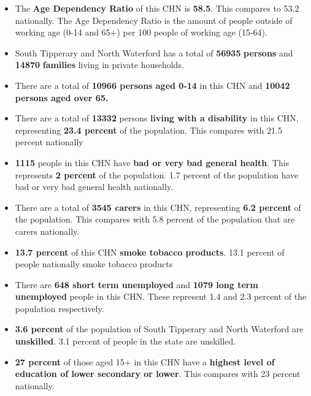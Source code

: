 \documentclass{article}
\begin{document}
\begin{itemize}

\item The \textbf{Age Dependency Ratio} of this CHN is  \textbf{58.5}. This compares to 53.2 nationally. The Age Dependency Ratio is the amount of people outside of working age (0-14 and 65+) per 100 people of working age (15-64). 

\item South Tipperary and North Waterford has a total of \textbf{\num{56935}} \textbf{persons} and  \textbf{\num{14870}} \textbf{families} living in private households.

\item There are a total of \textbf{\num{10966} persons aged 0-14} in this CHN and \textbf{\num{10042} persons aged over 65.} 

\item There are a total of \textbf{\num{13332}} persons \textbf{living with a disability} in this CHN, representing \textbf{23.4 percent} of the population. This compares with  21.5 percent nationally

\item \textbf{\num{1115}} people in this CHN have \textbf{bad or very bad general health}. This represents \textbf{2 percent} of the population. 1.7 percent of the population have bad or very bad general health nationally. 

\item There are a total of \textbf{\num{3545} carers} in this CHN, representing \textbf{6.2 percent} of the population. This compares with 5.8 percent of the population that are carers nationally. 

\item \textbf{13.7 percent} of this CHN \textbf{smoke tobacco products}. 13.1 percent of people nationally smoke tobacco products

\item There are \textbf{\num{648} short term unemployed} and \textbf{\num{1079} long term unemployed} people in this CHN. These represent 1.4 and 2.3 percent of the population respectively.

\item  \textbf{3.6 percent} of the population of South Tipperary and North Waterford are \textbf{unskilled}. 3.1 percent of people in the state are unskilled.

\item \textbf{27 percent} of those aged 15+ in this CHN have a \textbf{highest level of education of lower secondary or lower}. This compares with 23 percent nationally. 


\end{itemize}
\end{document}
